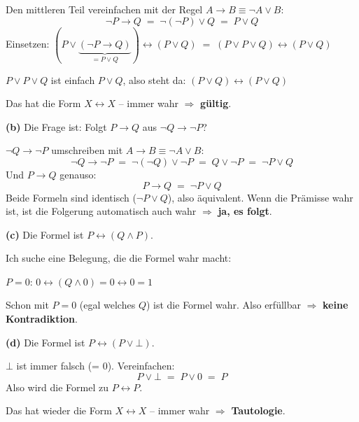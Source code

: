 \documentclass[a4paper,12pt]{article}
\begin{document}
Den mittleren Teil vereinfachen mit der Regel
$A \to B \equiv \neg A \vee B$:
\[
\neg P \to Q \;=\; \neg(\neg P) \vee Q \;=\; P \vee Q
\]
Einsetzen:
$(P \vee \underbrace{(\neg P \to Q)}_{= P \vee Q})
\leftrightarrow (P \vee Q)
\;=\; (P \vee P \vee Q) \leftrightarrow (P \vee Q)$

$P \vee P \vee Q$ ist einfach $P \vee Q$, also steht da:
$(P \vee Q) \leftrightarrow (P \vee Q)$

Das hat die Form $X \leftrightarrow X$ -- immer wahr
$\Rightarrow$ \textbf{g\"ultig}.

\medskip
\textbf{(b)} Die Frage ist: Folgt $P \to Q$ aus $\neg Q \to \neg P$?

$\neg Q \to \neg P$ umschreiben mit $A \to B \equiv \neg A \vee B$:
\[
\neg Q \to \neg P \;=\; \neg(\neg Q) \vee \neg P \;=\; Q \vee \neg P
  \;=\; \neg P \vee Q
\]
Und $P \to Q$ genauso:
\[
P \to Q \;=\; \neg P \vee Q
\]
Beide Formeln sind identisch ($\neg P \vee Q$), also \"aquivalent.
Wenn die Pr\"amisse wahr ist, ist die Folgerung automatisch auch wahr
$\Rightarrow$ \textbf{ja, es folgt}.

\medskip
\textbf{(c)} Die Formel ist $P \leftrightarrow (Q \wedge P)$.

Ich suche eine Belegung, die die Formel wahr macht:

$P = 0$: \;$0 \leftrightarrow (Q \wedge 0)
= 0 \leftrightarrow 0 = 1$ \checkmark

Schon mit $P=0$ (egal welches $Q$) ist die Formel wahr.
Also erf\"ullbar $\Rightarrow$ \textbf{keine Kontradiktion}.

\medskip
\textbf{(d)} Die Formel ist $P \leftrightarrow (P \vee \bot)$.

$\bot$ ist immer falsch (= 0). Vereinfachen:
\[
P \vee \bot \;=\; P \vee 0 \;=\; P
\]
Also wird die Formel zu $P \leftrightarrow P$.

Das hat wieder die Form $X \leftrightarrow X$ -- immer wahr
$\Rightarrow$ \textbf{Tautologie}.
\end{document}
